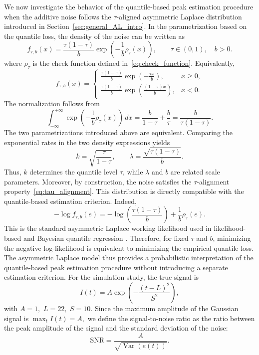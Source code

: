\documentclass[12pt,a4paper]{article}
\begin{document}
We now investigate the behavior of the quantile-based peak estimation procedure when the additive noise follows the $\tau$-aligned asymmetric Laplace distribution introduced in Section~\ref{sec:general_AL_intro}. In the parametrization based on the quantile loss, the density of the noise can be written as
\begin{equation}
	f_{\tau,b}(x)
	=
	\frac{\tau(1-\tau)}{b}
	\exp\left(
	-\frac{1}{b}\rho_\tau(x)
	\right),
	\qquad
	\tau\in(0,1),\quad b>0.
	\label{eq:AL_density}
\end{equation}
where $\rho_\tau$ is the check function defined in~\eqref{eq:check_function}.
Equivalently,
\[
f_{\tau,b}(x)
=
\begin{cases}
	\displaystyle
	\frac{\tau(1-\tau)}{b}
	\exp\left(-\frac{\tau x}{b}\right), & x\geq 0, \\[8pt]
	\displaystyle
	\frac{\tau(1-\tau)}{b}
	\exp\left(\frac{(1-\tau)x}{b}\right), & x<0.
\end{cases}
\]
The normalization follows from
\[
\int_{-\infty}^{+\infty}
\exp\left(-\frac{1}{b}\rho_\tau(x)\right)\,dx
=
\frac{b}{1-\tau}+\frac{b}{\tau}
=
\frac{b}{\tau(1-\tau)}.
\]
The two parametrizations introduced above are equivalent. Comparing the exponential rates in the two density expressions yields
\[
k=\sqrt{\frac{\tau}{1-\tau}},
\qquad
\lambda=\frac{\sqrt{\tau(1-\tau)}}{b}.
\]
Thus, \(k\) determines the quantile level \(\tau\), while \(\lambda\) and \(b\) are related scale parameters. Moreover, by construction,
the noise satisfies the $\tau$-alignment property~\eqref{eq:tau_alignment}.
This distribution is directly compatible with the quantile-based estimation criterion. Indeed,
\[
-\log f_{\tau,b}(e)
=
-\log\left(\frac{\tau(1-\tau)}{b}\right)
+
\frac{1}{b}\rho_\tau(e).
\]
This is the standard asymmetric Laplace working likelihood used in
likelihood-based and Bayesian quantile regression
\citep{Koenker1999,Yu2001}.
Therefore, for fixed $\tau$ and $b$, minimizing the negative log-likelihood is equivalent to minimizing the empirical quantile loss. The asymmetric Laplace model thus provides a probabilistic interpretation of the quantile-based peak estimation procedure without introducing a separate estimation criterion.
For the simulation study, the true signal is
\[
I(t)
=
A\exp\left(-\frac{(t-L)^2}{S^2}\right),
\]
with
$A=1,$
$L=22,$
$S=10.$
Since the maximum amplitude of the Gaussian signal is
\(
\max_t I(t)=A,
\)
we define the signal-to-noise ratio as the ratio between the peak
amplitude of the signal and the standard deviation of the noise:
\begin{equation}
	\mathrm{SNR}
	=
	\frac{A}{\sqrt{\operatorname{Var}(e(t))}}.
	\label{eq:SNR_definition}
\end{equation}
\end{document}
